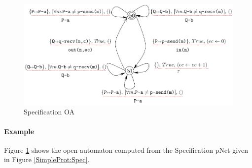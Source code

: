 \documentclass{lmcs}
\newcommand{\TODO}[1]{\textcolor{red}{\textbf{[TODO:#1]}}}
\begin{document}







\begin{figure}[ht]
   \centerline{\includegraphics[width=12cm]{XFIG/SPSpecOpen}}
   \caption{Specification OA}
   \label{SimpleProtCounter:SpecOA}
\end{figure}


\paragraph{Example} Figure \ref{SimpleProtCounter:SpecOA} shows the open automaton computed from the Specification pNet given in Figure \ref{SimpleProt:Spec}. 


\end{document}
